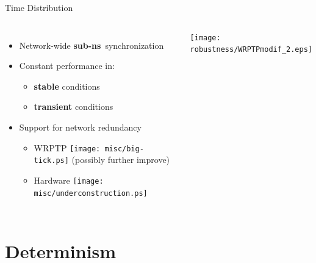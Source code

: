 \documentclass[compress,red]{beamer}
\begin{document}
\begin{frame}{Time Distribution}

  \begin{columns}[c]

  \begin{itemize}
    \item Network-wide {\bf sub-ns}~synchronization
    \vspace{0.3cm}
    \item Constant performance in:
	\begin{itemize}
	  \item {\bf stable} conditions
	  \item {\bf transient} conditions
	\end{itemize}
    \vspace{0.3cm}
    \item Support for network redundancy
    \begin{itemize}
      \item WRPTP \texttt{[image: misc/big-tick.ps]}  (possibly further improve)
      \item Hardware \texttt{[image: misc/underconstruction.ps]}
    \end{itemize}
  \end{itemize}


      \begin{center}
	\texttt{[image: robustness/WRPTPmodif\_2.eps]}
      \end{center}  
    

  \end{columns}

\end{frame}
\section{Determinism}
\end{document}
